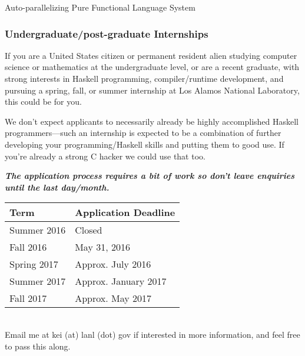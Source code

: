 \documentclass[DIV16,twocolumn,10pt]{scrreprt}
\begin{document}
\begin{hcarentry}{Auto-parallelizing Pure Functional Language System}
\subsubsection*{Undergraduate/post-graduate Internships}

If you are a United States citizen or permanent resident alien studying
computer science or mathematics at the undergraduate level, or are a recent
graduate, with strong interests in Haskell programming, compiler/runtime
development, and pursuing a spring, fall, or summer internship at Los
Alamos National Laboratory, this could be for you.

We don't expect applicants to necessarily already be highly accomplished
Haskell programmers---such an internship is expected to be a combination of
further developing your programming/Haskell skills and putting them to good
use.  If you're already a strong C hacker we could use that too.

\emph{\bfseries The application process requires a bit of work so don't leave
  enquiries until the last day/month.}\\

\begin{tabular}{l|l}
Term & Application Deadline \\
\hline
Summer 2016  & Closed \\
Fall 2016    & May 31, 2016 \\
Spring 2017  & Approx. July 2016 \\
Summer 2017  & Approx. January 2017 \\
Fall 2017    & Approx. May 2017
\end{tabular}\\

\noindent Email me at kei (at) lanl (dot) gov if interested in more information, and
feel free to pass this along. \\

\end{hcarentry}
\end{document}
